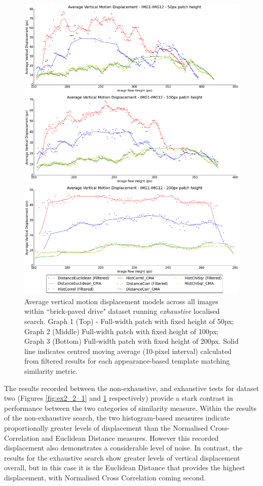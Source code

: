 \clearpage
\begin{figure}[ht!]
\centering
\includegraphics[scale=0.3]{images/results/wiltshire_outside_10cm_non_scaled_exhaustive}
\caption{Average vertical motion displacement models across all images within ``brick-paved drive" dataset running \textit{exhaustive} localised search. Graph 1 (Top) - Full-width patch with fixed height of 50px; Graph 2 (Middle) Full-width patch with fixed height of 100px; Graph 3 (Bottom) Full-width patch with fixed height of 200px. Solid line indicates centred moving average (10-pixel interval) calculated from filtered results for each appearance-based template matching similarity metric.}
\label{fig:ex2_2_2}
\end{figure}

The results recorded between the non-exhaustive, and exhaustive tests for dataset two (Figures \ref{fig:ex2_2_1} and \ref{fig:ex2_2_2} respectively) provide a stark contrast in performance between the two categories of similarity measure. Within the results of the non-exhaustive search, the two histogram-based measures indicate proportionally greater levels of displacement than the Normalised Cross-Correlation and Euclidean Distance measures. However this recorded displacement also demonstrates a considerable level of noise. In contrast, the results for the exhaustive search show greater levels of vertical displacement overall, but in this case it is the Euclidean Distance that provides the highest displacement, with Normalised Cross Correlation coming second.  

